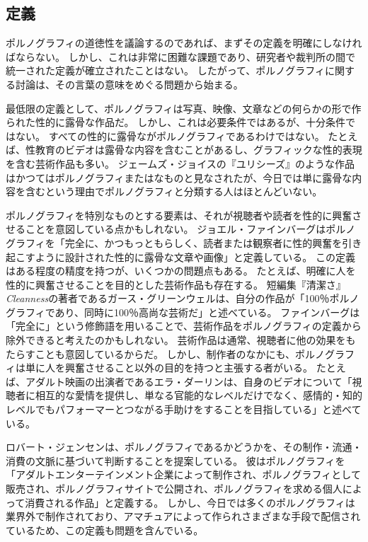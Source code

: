 \documentclass[paper=a4,book,openany]{jlreq}
\newcommand{\ig}[1]{}           %
\begin{document}
\subsection{定義}

ポルノグラフィの道徳性を議論するのであれば、まずその定義を明確にしなければならない。
しかし、これは非常に困難な課題であり、研究者や裁判所の間で統一された定義が確立されたことはない。
したがって、ポルノグラフィに関する討論は、その言葉の意味をめぐる問題から始まる。

最低限の定義として、ポルノグラフィは写真、映像、文章などの何らかの形で作られた性的に露骨な作品だ。
しかし、これは必要条件ではあるが、十分条件ではない。
すべての性的に露骨ながポルノグラフィであるわけではない。
たとえば、性教育のビデオは露骨な内容を含むことがあるし、グラフィックな性的表現を含む芸術作品も多い。
ジェームズ・ジョイスの『ユリシーズ』のような作品はかつてはポルノグラフィまたはなものと見なされたが、今日では単に露骨な内容を含むという理由でポルノグラフィと分類する人はほとんどいない。

ポルノグラフィを特別なものとする要素は、それが視聴者や読者を性的に興奮させることを意図している点かもしれない。
ジョエル・ファインバーグはポルノグラフィを「完全に、かつもっともらしく、読者または観察者に性的興奮を引き起こすように設計された性的に露骨な文章や画像」と定義している\citep[p.127]{feinberg85:_offen_to_other}。
この定義はある程度の精度を持つが、いくつかの問題点もある。
たとえば、明確に人を性的に興奮させることを目的とした芸術作品も存在する。
短編集『清潔さ』\emph{Cleanness}の著者であるガース・グリーンウェルは、自分の作品が「100％ポルノグラフィであり、同時に100％高尚な芸術だ」と述べている\citep{barone20:_garth_green_comes_clean}。
ファインバーグは「完全に」という修飾語を用いることで、芸術作品をポルノグラフィの定義から除外できると考えたのかもしれない。
芸術作品は通常、視聴者に他の効果をもたらすことも意図しているからだ。
しかし、制作者のなかにも、ポルノグラフィは単に人を興奮させること以外の目的を持つと主張する者がいる。
たとえば、アダルト映画の出演者であるエラ・ダーリン\ig{Ella Darling}は、自身のビデオについて「視聴者に相互的な愛情を提供し、単なる官能的なレベルだけでなく、感情的・知的レベルでもパフォーマーとつながる手助けをすることを目指している」と述べている\citep{bell19:_women_are_leadin_porns_lates_reinv}。
\ig{Ella Darling}

ロバート・ジェンセンは、ポルノグラフィであるかどうかを、その制作・流通・消費の文脈に基づいて判断することを提案している。
彼はポルノグラフィを「アダルトエンターテインメント企業によって制作され、ポルノグラフィとして販売され、ポルノグラフィサイトで公開され、ポルノグラフィを求める個人によって消費される作品」と定義する\citep[p.53]{jensen07:gettingoff}。
しかし、今日では多くのポルノグラフィは業界外で制作されており、アマチュアによって作られさまざまな手段で配信されているため、この定義も問題を含んでいる。
\end{document}
